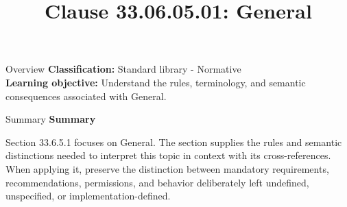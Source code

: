 \documentclass[10pt,letterpaper]{article}
\title{Clause 33.06.05.01: General}
\author{}
\date{}
\begin{document}
\maketitle
\begin{CornellOverviewBox}{Overview}
\textbf{Classification:} Standard library - Normative\\[2pt]
\textbf{Learning objective:} Understand the rules, terminology, and semantic consequences associated with General.
\end{CornellOverviewBox}\begin{CornellSummaryBox}{Summary}
{\sffamily\bfseries\color{Accent} Summary}\par\vspace{3pt}Section 33.6.5.1 focuses on General. The section supplies the rules and semantic distinctions needed to interpret this topic in context with its cross-references. When applying it, preserve the distinction between mandatory requirements, recommendations, permissions, and behavior deliberately left undefined, unspecified, or implementation-defined.
\end{CornellSummaryBox}
\end{document}

